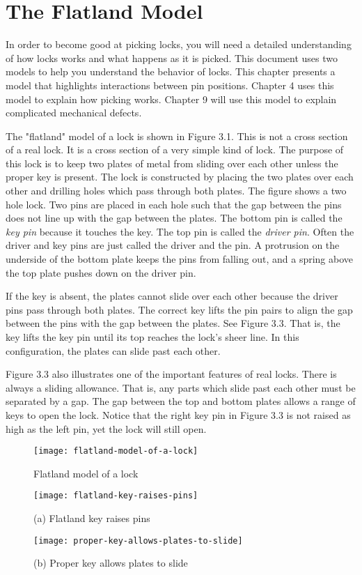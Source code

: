 \chapter{The Flatland Model}
In order to become good at picking locks, you will need a detailed understanding of how
locks works and what happens as it is picked. This document uses two models to help you
understand the behavior of locks. This chapter presents a model that highlights interactions
between pin positions. Chapter 4 uses this model to explain how picking works. Chapter 9
will use this model to explain complicated mechanical defects.

The "flatland" model of a lock is shown in Figure 3.1. This is not a cross section of a
real lock. It is a cross section of a very simple kind of lock. The purpose of this lock is to
keep two plates of metal from sliding over each other unless the proper key is present. The
lock is constructed by placing the two plates over each other and drilling holes which pass
through both plates. The figure shows a two hole lock. Two pins are placed in each hole
such that the gap between the pins does not line up with the gap between the plates.
The bottom pin is called the \textit{key pin} because it touches the key.
The top pin is called the \textit{driver pin}. Often the driver and key pins are just called the driver and the pin. A protrusion on the underside of the bottom plate keeps the pins from falling out, and a spring above the top plate pushes down on the driver pin.

If the key is absent, the plates cannot slide over each other because the driver pins pass
through both plates. The correct key lifts the pin pairs to align the gap between the pins
with the gap between the plates. See Figure 3.3. That is, the key lifts the key pin until its
top reaches the lock's sheer line. In this configuration, the plates can slide past each other.

Figure 3.3 also illustrates one of the important features of real locks. There is always a
sliding allowance. That is, any parts which slide past each other must be separated by a
gap. The gap between the top and bottom plates allows a range of keys to open the lock.
Notice that the right key pin in Figure 3.3 is not raised as high as the left pin, yet the lock
will still open.

\begin{figure}
    \texttt{[image: flatland-model-of-a-lock]}
    \caption{Flatland model of a lock}
\end{figure}

\begin{figure}
    \texttt{[image: flatland-key-raises-pins]}
    \caption{(a) Flatland key raises pins}
\end{figure}

\begin{figure}
    \texttt{[image: proper-key-allows-plates-to-slide]}
    \caption{(b) Proper key allows plates to slide}
\end{figure}